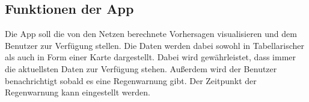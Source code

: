 \subsection{Funktionen der App}\label{funktionen der App}
Die App soll die von den Netzen berechnete Vorhersagen visualisieren und dem Benutzer zur Verfügung stellen. Die Daten werden dabei sowohl in Tabellarischer als auch in Form einer Karte dargestellt. Dabei wird gewährleistet, dass immer die aktuellsten Daten zur Verfügung stehen. Außerdem wird der Benutzer benachrichtigt sobald es eine Regenwarnung gibt. Der Zeitpunkt der Regenwarnung kann eingestellt werden.   

 